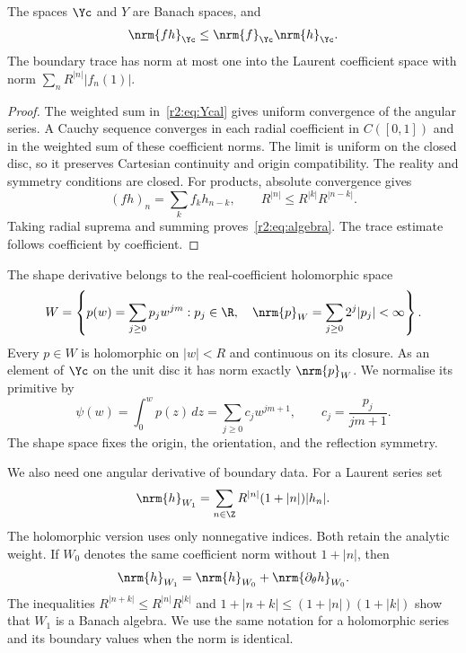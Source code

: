 \begin{lemma}\label{r2:lem:algebra}
The spaces $\Yc$ and $Y$ are Banach spaces, and
\begin{equation}\label{r2:eq:algebra}
 \nrm{fh}_{\Yc}\le\nrm{f}_{\Yc}\nrm{h}_{\Yc}.
\end{equation}
The boundary trace has norm at most one into the Laurent coefficient space with norm $\sum_nR^{|n|}|f_n(1)|$.
\end{lemma}
\begin{proof}
The weighted sum in~\eqref{r2:eq:Ycal} gives uniform convergence of the angular series. A Cauchy sequence converges in each radial coefficient in $C([0,1])$ and in the weighted sum of these coefficient norms. The limit is uniform on the closed disc, so it preserves Cartesian continuity and origin compatibility. The reality and symmetry conditions are closed. For products, absolute convergence gives
\[
 (fh)_n=\sum_k f_kh_{n-k},\qquad
 R^{|n|}\le R^{|k|}R^{|n-k|}.
\]
Taking radial suprema and summing proves~\eqref{r2:eq:algebra}. The trace estimate follows coefficient by coefficient.
\end{proof}

The shape derivative belongs to the real-coefficient holomorphic space
\begin{equation}\label{r2:eq:W}
 W=\left\{p(w)=\sum_{j\ge0}p_jw^{jm}:p_j\in\R,
 \quad\nrm{p}_W=\sum_{j\ge0}2^j|p_j|<\infty\right\}.
\end{equation}
Every $p\in W$ is holomorphic on $|w|<R$ and continuous on its closure. As an element of $\Yc$ on the unit disc it has norm exactly $\nrm{p}_W$. We normalise its primitive by
\begin{equation}\label{r2:eq:primitive}
 \psi(w)=\int_0^w p(z)\,dz
 =\sum_{j\ge0}c_jw^{jm+1},\qquad
 c_j=\frac{p_j}{jm+1}.
\end{equation}
The shape space fixes the origin, the orientation, and the reflection symmetry.

We also need one angular derivative of boundary data. For a Laurent series set
\begin{equation}\label{r2:eq:Wone}
 \nrm{h}_{W_1}=\sum_{n\in\Z}R^{|n|}(1+|n|)|h_n|.
\end{equation}
The holomorphic version uses only nonnegative indices. Both retain the analytic weight. If $W_0$ denotes the same coefficient norm without $1+|n|$, then
\[
 \nrm{h}_{W_1}=\nrm{h}_{W_0}+\nrm{\partial_\theta h}_{W_0}.
\]
The inequalities $R^{|n+k|}\le R^{|n|}R^{|k|}$ and $1+|n+k|\le(1+|n|)(1+|k|)$ show that $W_1$ is a Banach algebra. We use the same notation for a holomorphic series and its boundary values when the norm is identical.


